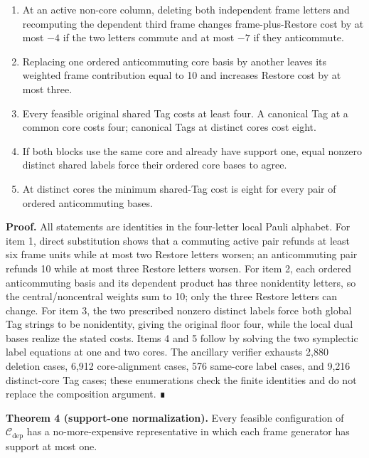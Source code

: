 \documentclass[
  11pt,
]{article}
\providecommand{\tightlist}{%
  \setlength{\itemsep}{0pt}\setlength{\parskip}{0pt}}
\begin{document}
\begin{enumerate}
\def\labelenumi{\arabic{enumi}.}
\tightlist
\item
  At an active non-core column, deleting both independent frame letters
  and recomputing the dependent third frame changes frame-plus-Restore
  cost by at most \(-4\) if the two letters commute and at most \(-7\)
  if they anticommute.
\item
  Replacing one ordered anticommuting core basis by another leaves its
  weighted frame contribution equal to 10 and increases Restore cost by
  at most three.
\item
  Every feasible original shared Tag costs at least four. A canonical
  Tag at a common core costs four; canonical Tags at distinct cores cost
  eight.
\item
  If both blocks use the same core and already have support one, equal
  nonzero distinct shared labels force their ordered core bases to
  agree.
\item
  At distinct cores the minimum shared-Tag cost is eight for every pair
  of ordered anticommuting bases.
\end{enumerate}

\textbf{Proof.} All statements are identities in the four-letter local
Pauli alphabet. For item 1, direct substitution shows that a commuting
active pair refunds at least six frame units while at most two Restore
letters worsen; an anticommuting pair refunds 10 while at most three
Restore letters worsen. For item 2, each ordered anticommuting basis and
its dependent product has three nonidentity letters, so the
central/noncentral weights sum to 10; only the three Restore letters can
change. For item 3, the two prescribed nonzero distinct labels force
both global Tag strings to be nonidentity, giving the original floor
four, while the local dual bases realize the stated costs. Items 4 and 5
follow by solving the two symplectic label equations at one and two
cores. The ancillary verifier exhausts 2,880 deletion cases, 6,912
core-alignment cases, 576 same-core label cases, and 9,216 distinct-core
Tag cases; these enumerations check the finite identities and do not
replace the composition argument. ∎

\textbf{Theorem 4 (support-one normalization).} Every feasible
configuration of \(\mathcal C_{\mathrm{dep}}\) has a no-more-expensive
representative in which each frame generator has support at most one.
\end{document}
